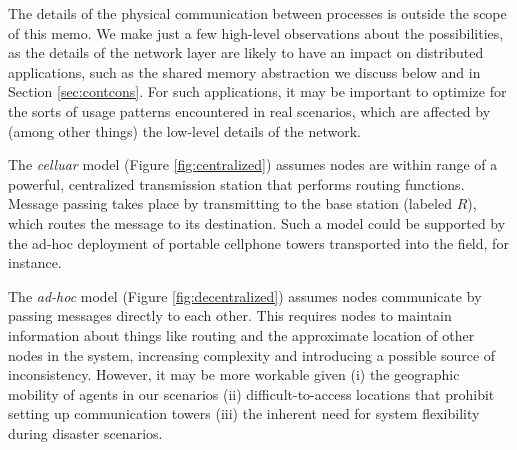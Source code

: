 \documentclass[]             %
{NASA}                       %
\theoremstyle{definition}
\begin{document}
The details of the physical communication between processes is outside
the scope of this memo. We make just a few high-level observations about
the possibilities, as the details of the network layer are likely to
have an impact on distributed applications, such as the shared memory
abstraction we discuss below and in Section \ref{sec:contcons}. For such
applications, it may be important to optimize for the sorts of usage
patterns encountered in real scenarios, which are affected by (among
other things) the low-level details of the network.

The \emph{celluar} model (Figure \ref{fig:centralized}) assumes nodes
are within range of a powerful, centralized transmission station that
performs routing functions. Message passing takes place by transmitting
to the base station (labeled \(R\)), which routes the message to its
destination. Such a model could be supported by the ad-hoc deployment of
portable cellphone towers transported into the field, for instance.

The \emph{ad-hoc} model (Figure \ref{fig:decentralized}) assumes nodes
communicate by passing messages directly to each other. This requires
nodes to maintain information about things like routing and the
approximate location of other nodes in the system, increasing complexity
and introducing a possible source of inconsistency. However, it may be
more workable given (i) the geographic mobility of agents in our
scenarios (ii) difficult-to-access locations that prohibit setting up
communication towers (iii) the inherent need for system flexibility
during disaster scenarios.
\end{document}
